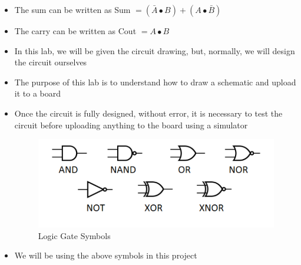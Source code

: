 \begin{itemize}
  \item The sum can be written as Sum $=(\bar{A}\bullet B)+(A\bullet\bar{B})$

  \item The carry can be written as Cout $=A\bullet B$

  \item In this lab, we will be given the circuit drawing, but, normally, we will design the circuit ourselves

  \item The purpose of this lab is to understand how to draw a schematic and upload it to a board

  \item Once the circuit is fully designed, without error, it is necessary to test the circuit before uploading anything to the board using a simulator

    \begin{figure}[h!]
      \centering
      \includegraphics[width=.9\textwidth]{Figures/symbols.png}
      \caption{Logic Gate Symbols}
      \label{fig:3}
    \end{figure}

  \item We will be using the above symbols in this project

\end{itemize}




